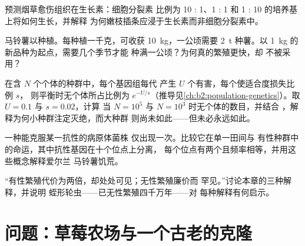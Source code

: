 \begin{exercise}[$\star\star$]\label{exo:b2:asexual-reproduction:8}
预测烟草愈伤组织在生长素：细胞分裂素
比例为 10 : 1、1 : 1 和 1 : 10 的培养基上将如何生长，并解释
为何嫩枝插条应浸于生长素而非细胞分裂素中。
\end{exercise}

\begin{exercise}[$\star\star$]\label{exo:b2:asexual-reproduction:9}
马铃薯以种植。每种植一千克，可收获
\qty{10}{kg}，一公顷需要 \qty{2}{t} 种薯。以
\qty{1}{kg} 的新品种为起点，需要几个季节才能
种满一公顷？为何真的繁殖更快，却
不被采用？
\end{exercise}

\begin{exercise}[$\star\star\star$]\label{exo:b2:asexual-reproduction:10}
在含 $N$ 个个体的种群中，每个基因组每代
产生 $U$ 个有害，每个使适合度损失比例 $s$，
则平衡时无个体所占比例为
$e^{-U/s}$（推导见\cref{ch:b2:population-genetics}）。取 $U =
0.1$ 与 $s = 0.02$，计算
当 $N = 10^{5}$ 与 $N = 10^{3}$ 时无个体的数目，并结合
，解释为何小种群注定灭绝，而大种群
则尚未如此——但未必永远如此。
\end{exercise}

\begin{exercise}[$\star\star\star$]\label{exo:b2:asexual-reproduction:11}
一种能克服某一抗性的病原体菌株
仅出现一次。比较它在单一田间与
有性种群中的命运，其中抗性基因在十个位点上分离，
每个位点有两个且频率相等，并用这些概念解释爱尔兰
马铃薯饥荒。
\end{exercise}

\begin{exercise}[$\star\star\star$]\label{exo:b2:asexual-reproduction:12}
“有性繁殖代价为两倍，却处处可见；无性繁殖廉价而
罕见。”讨论本章的三种解释，并说明
蛭形轮虫——已无性繁殖四千万年——对
每种解释有何启示。
\end{exercise}

\section{问题：草莓农场与一个古老的克隆}

